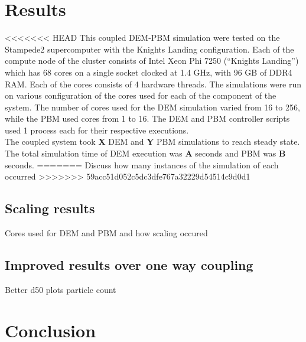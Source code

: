 \documentclass[fleqn,twoside,10pt]{article}
\begin{document}

\section{Results}
\label{results}
<<<<<<< HEAD
This coupled DEM-PBM simulation were tested on the Stampede2 supercomputer with the Knights Landing 
configuration. Each of the compute node of the cluster consists of Intel Xeon Phi 7250 
(\textquotedblleft Knights Landing\textquotedblright) which has 68 cores on a single socket 
clocked at 1.4 GHz, with 96 GB of DDR4 RAM. Each of the cores consists of 4 hardware threads. 
The simulations were run on various configuration of the cores used for each of the 
component of the system. The number of cores used for the DEM simulation varied from 16 to 256, 
while the PBM used cores from 1 to 16. The DEM and PBM controller scripts used 1 process each for 
their respective executions.\\
The coupled system took \textbf{X} DEM and \textbf{Y} PBM simulations to reach steady state. The 
total simulation time of DEM execution was \textbf{A} seconds and PBM was \textbf{B} seconds. 
=======
Discuss how many instances of the simulation of each occurred
>>>>>>> 59acc51d052c5dc3dfe767a32229d54514c9d0d1
\subsection{Scaling results}
Cores used for DEM and PBM and how scaling occured
\subsection{Improved results over one way coupling}
Better d50 plots particle count
\section{Conclusion}



\end{document}
